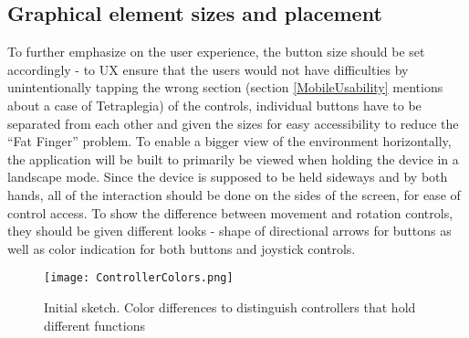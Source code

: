 \subsection{Graphical element sizes and placement}
To further emphasize on the user experience, the button size should be set accordingly - 
to UX ensure that the users would not have difficulties by unintentionally tapping the wrong section (section \ref{MobileUsability} mentions about a case of Tetraplegia) of the controls, individual buttons have to be separated from each other and given the sizes for easy accessibility to reduce the “Fat Finger” problem. To enable a bigger view of the environment horizontally, the application will be built to primarily be viewed when holding the device in a landscape mode. Since the device is supposed to be held sideways and by both hands, all of the interaction should be done on the sides of the screen, for ease of control access.
To show the difference between movement and rotation controls, they should be given different looks - shape of directional arrows for buttons as well as color indication for both buttons and joystick controls.

\begin{figure}[H]
\centering
\texttt{[image: ControllerColors.png]}
\caption{Initial sketch. Color differences to distinguish controllers that hold different functions}
\end{figure}

